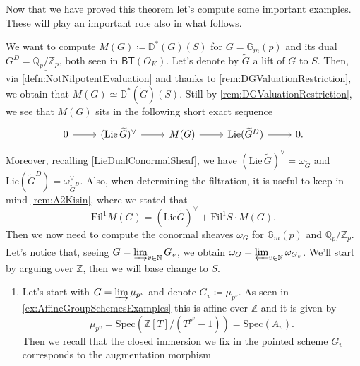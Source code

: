 \noindent
Now that we have proved this theorem let's compute some important examples.
These will play an important role also in what follows.
\begin{ex}[]\label{DieudonneModulesSimpleExamples}
	We want to compute $M(G) \coloneqq \mathbb{D}^*(G)(S)$ for
	$G = \mathbb{G}_m(p)$ and its dual 
	$G^D = \underline{\mathbb{Q}_p/\mathbb{Z}_{p}}$,
	both seen in $\mathsf{BT}(O_K)$.
	Let's denote by $\widetilde{G}$ a lift of $G$ to $S$.
	Then, via \cref{defn:NotNilpotentEvaluation} and thanks to \cref{rem:DGValuationRestriction},
	we obtain that $M(G) \simeq \mathbb{D}^*(\widetilde{G})(S)$.
	Still by \cref{rem:DGValuationRestriction}, we see that $M(G)$
	sits in the following short exact sequence
	\begin{equation}\label{eqn:MGSES}
	\begin{tikzcd}
		0 \arrow[r, "", rightarrow] &
		( \mathrm{Lie}\, \widetilde{G} )^\vee \arrow[r, "", rightarrow] &
		M(G) \arrow[r, "", rightarrow] &
		\mathrm{Lie}(\widetilde{G}^D) \arrow[r, "", rightarrow] &
		0
	.\end{tikzcd}
	\end{equation}
	Moreover, recalling \cref{LieDualConormalSheaf}, we have
	$(\mathrm{Lie}\, \widetilde{G})^\vee = \omega_{\widetilde{G}}$ and
	$\mathrm{Lie}(\widetilde{G}^D) = \omega_{\widetilde{G}^D}^\vee$.
	Also, when determining the filtration, it is useful to keep
	in mind \cref{rem:A2Kisin}, where we stated that 
	\begin{equation*}
		\mathrm{Fil}^1 M(G) =
		( \mathrm{Lie} \widetilde{G} )^\vee +
		\mathrm{Fil}^1S \cdot M(G)
	.\end{equation*}
	Then we now need to compute the conormal sheaves $\omega_G$ for $\mathbb{G}_m(p)$
	and $\underline{\mathbb{Q}_p/\mathbb{Z}_{p}}$.
	Let's notice that, seeing $G = \varinjlim_{v \in \mathbb{N}} G_v$, we
	obtain $\omega_G = \varprojlim_{v \in \mathbb{N}} \omega_{G_v}$.
	We'll start by arguing over $\mathbb{Z}$, then we will base change
	to $S$.
\begin{enumerate}
	\item Let's start with $G = \varinjlim \mu_{p^v}$ and denote $G_v \coloneqq \mu_{p^v}$.
		As seen in \cref{ex:AffineGroupSchemesExamples} this is affine over
		$\mathbb{Z}$ and it is given by
		\begin{equation*}
			\mu_{p^v} = \mathrm{Spec}(\mathbb{Z}[T]/ (T^{p^v} - 1)) = \mathrm{Spec}(A_v)
		.\end{equation*}
		Then we recall that the closed immersion we fix in the pointed
		scheme $G_v$ corresponds to the augmentation morphism

\end{enumerate}
\end{ex}
